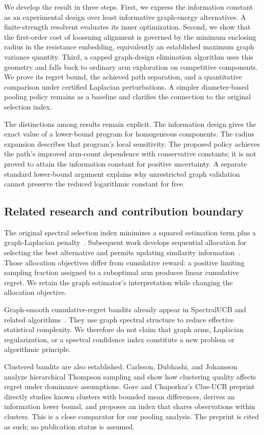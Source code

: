 We develop the result in three steps. First, we express the information constant as an experimental design over least informative graph-energy alternatives. A finite-strength resolvent evaluates its inner optimization. Second, we show that the first-order cost of loosening alignment is governed by the minimum enclosing radius in the resistance embedding, equivalently an established maximum graph variance quantity. Third, a capped graph-design elimination algorithm uses this geometry and falls back to ordinary arm exploration on competitive components. We prove its regret bound, the achieved path separation, and a quantitative comparison under certified Laplacian perturbations. A simpler diameter-based pooling policy remains as a baseline and clarifies the connection to the original selection index.

The distinctions among results remain explicit. The information design gives the exact value of a lower-bound program for homogeneous components. The radius expansion describes that program's local sensitivity. The proposed policy achieves the path's improved arm-count dependence with conservative constants; it is not proved to attain the information constant for positive uncertainty. A separate standard lower-bound argument explains why unrestricted graph validation cannot preserve the reduced logarithmic constant for free.

\subsection{Related research and contribution boundary}
The original spectral selection index minimizes a squared estimation term plus a graph-Laplacian penalty~\cite{collected14}. Subsequent work develops sequential allocation for selecting the best alternative and permits updating similarity information~\cite{collected15}. Those allocation objectives differ from cumulative reward: a positive limiting sampling fraction assigned to a suboptimal arm produces linear cumulative regret. We retain the graph estimator's interpretation while changing the allocation objective.

Graph-smooth cumulative-regret bandits already appear in SpectralUCB and related algorithms~\cite{collected1,collected17}. They use graph spectral structure to reduce effective statistical complexity. We therefore do not claim that graph arms, Laplacian regularization, or a spectral confidence index constitute a new problem or algorithmic principle.

Clustered bandits are also established. Carlsson, Dubhashi, and Johansson~\cite{collected18} analyze hierarchical Thompson sampling and show how clustering quality affects regret under dominance assumptions. Gore and Chaporkar's Clus-UCB preprint~\cite{collected19} directly studies known clusters with bounded mean differences, derives an information lower bound, and proposes an index that shares observations within clusters. This is a close comparator for our pooling analysis. The preprint is cited as such; no publication status is assumed.

